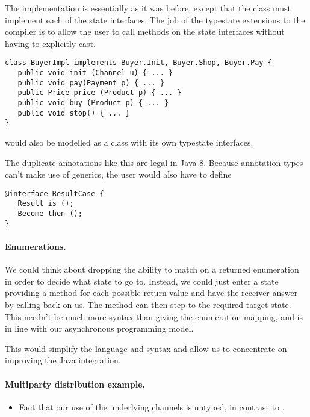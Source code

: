 \noindent The implementation is essentially as it was before, except
that the class  must implement each of the state
interfaces. The job of the typestate extensions to the compiler is to
allow the user to call methods on the state interfaces without having
to explicitly cast.

\begin{lstlisting}
class BuyerImpl implements Buyer.Init, Buyer.Shop, Buyer.Pay {
   public void init (Channel u) { ... }
   public void pay(Payment p) { ... }
   public Price price (Product p) { ... }
   public void buy (Product p) { ... }
   public void stop() { ... }
}
\end{lstlisting}

\noindent {} would also be modelled as a class with its own
typestate interfaces.

\noindent The duplicate annotations like this are legal in Java 8.
Because annotation types can't make use of generics, the user would
also have to define
\begin{lstlisting}
@interface ResultCase {
   Result is ();
   Become then ();
}
\end{lstlisting}

\paragraph{Enumerations.}

We could think about dropping the ability to match on a returned
enumeration in order to decide what state to go to. Instead, we could
just enter a state providing a method for each possible return value
and have the receiver answer by calling back on us. The method can
then step to the required target state. This needn't be much more
syntax than giving the enumeration mapping, and is in line with our
asynchronous programming model.

This would simplify the language and syntax and allow us to
concentrate on improving the Java integration.

\paragraph{Multiparty distribution example.}

\begin{itemize}
\item Fact that our use of the underlying channels is untyped, in
  contrast to \cite{gay10}.
\end{itemize}
